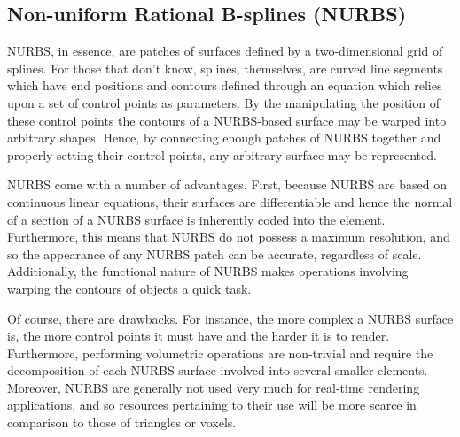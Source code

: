 \documentclass[onecolumn, draftclsnofoot,10pt, compsoc]{IEEEtran}
\begin{document}
\subsection{Non-uniform Rational B-splines (NURBS)}
NURBS, in essence, are patches of surfaces defined by a two-dimensional grid of splines.
For those that don’t know, splines, themselves, are curved line segments which have end positions and contours defined through an equation which relies upon a set of control points as parameters.
By the manipulating the position of these control points the contours of a NURBS-based surface may be warped into arbitrary shapes.
Hence, by connecting enough patches of NURBS together and properly setting their control points, any arbitrary surface may be represented.

NURBS come with a number of advantages.
First, because NURBS are based on continuous linear equations, their surfaces are differentiable and hence the normal of a section of a NURBS surface is inherently coded into the element.
Furthermore, this means that NURBS do not possess a maximum resolution, and so the appearance of any NURBS patch can be accurate, regardless of scale.
Additionally, the functional nature of NURBS makes operations involving warping the contours of objects a quick task.

Of course, there are drawbacks.
For instance, the more complex a NURBS surface is, the more control points it must have and the harder it is to render.
Furthermore, performing volumetric operations are non-trivial and require the decomposition of each NURBS surface involved into several smaller elements. 
Moreover, NURBS are generally not used very much for real-time rendering applications, and so resources pertaining to their use will be more scarce in comparison to those of triangles or voxels.
\end{document}
